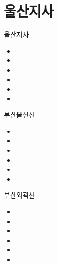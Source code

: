 \documentclass[aspectratio=1610,20pt,xcolor=pdftex,dvipsnames,table,handout]{beamer}
\begin{document}
		\section{울산지사}

		\begin{frame} [t,plain]
			\begin{block} {울산지사}
			\setlength{\leftmargini}{1em}			
			\begin{itemize}
				\item 
				\item 
				\item 
				\item 
				\item 
				\item 
			\end{itemize}
			\end{block}						
		\end{frame}					

		\begin{frame} [t,plain]
			\begin{block} {부산울산선}
			\setlength{\leftmargini}{1em}			
			\begin{itemize}
				\item 
				\item 
				\item 
				\item 
				\item 
				\item 
			\end{itemize}
			\end{block}						
		\end{frame}					


		\begin{frame} [t,plain]
			\begin{block} {부산외곽선}
			\setlength{\leftmargini}{1em}			
			\begin{itemize}
				\item 
				\item 
				\item 
				\item 
				\item 
				\item 
			\end{itemize}
			\end{block}						
		\end{frame}					
\end{document}
